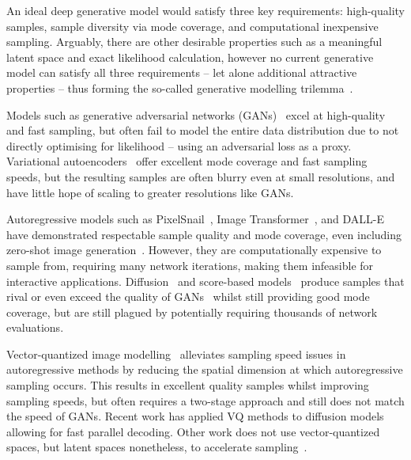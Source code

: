 An ideal deep generative model would satisfy three key requirements:
high-quality samples, sample diversity via mode coverage, and computational
inexpensive sampling. Arguably, there are other desirable properties such as a
meaningful latent space and exact likelihood calculation, however no current
generative model can satisfy all three requirements -- let alone additional
attractive properties -- thus forming the so-called generative modelling
trilemma~\cite{xiao2021trilemma}.

Models such as generative adversarial networks (GANs)~\cite{goodfellow2014gan}
excel at high-quality and fast sampling, but often fail to model the entire data
distribution due to not directly optimising for likelihood -- using an
adversarial loss as a proxy. Variational autoencoders~\cite{kingma2013vae} offer
excellent mode coverage and fast sampling speeds, but the resulting samples are
often blurry even at small resolutions, and have little hope of scaling to
greater resolutions like GANs.

Autoregressive models such as PixelSnail~\cite{chen2017snail}, Image
Transformer~\cite{parmar2018image}, and DALL-E~\cite{parmar2018image} have
demonstrated respectable sample quality and mode coverage, even including
zero-shot image generation~\cite{ramesh2021dalle}. However, they are
computationally expensive to sample from, requiring many network iterations,
making them infeasible for interactive applications. Diffusion~\cite{ho2020ddpm}
and score-based models~\cite{song2019sbm,song2020sde,song2021mlt} produce
samples that rival or even exceed the quality of GANs~\cite{dhariwal2021ddpm}
whilst still providing good mode coverage, but are still plagued by potentially
requiring thousands of network evaluations.

Vector-quantized image
modelling~\cite{oord2017vqvae,razavi2019generating,esser2021taming} alleviates
sampling speed issues in autoregressive methods by reducing the spatial
dimension at which autoregressive sampling occurs. This results in excellent
quality samples whilst improving sampling speeds, but often requires a two-stage
approach and still does not match the speed of GANs. Recent work has applied VQ
methods to diffusion models~\cite{bondtaylor2021unleashing} allowing for fast
parallel decoding. Other work does not use vector-quantized spaces, but latent
spaces nonetheless, to accelerate
sampling~\cite{xiao2021trilemma,vahdat2021sbmlatent}.

